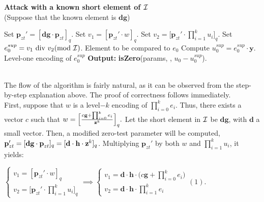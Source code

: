 \begin{tcolorbox}[colframe=black,colback=white,arc=0pt,outer arc=0pt]
	\begin{center}
		\textbf{Attack with a known short element of $\mathcal{I}$}\\
		(Suppose that the known element is $\textbf{dg}$)
	\end{center}
	\begin{algorithmic}[1]
		\State Set $\textbf{p}_{zt}' = [\textbf{dg} \cdot \textbf{p}_{zt}]_q$.
		\Statex
		\State Set $v_1 = [\textbf{p}_{zt}' \cdot w]_q$.
		\Statex
		\State Set $v_2 = \Bigg[ \textbf{p}_{zt}' \cdot \displaystyle{\prod_{i = 1}^{k} u_i} \Bigg]_q$.
		\Statex
		\State Set $e^{sup}_0 = v_1 \text{ div } v_2 (\text{mod } \mathcal{I})$. \Comment Element to be compared to $e_0$
		\Statex
		\State Compute $u_0^{sup} = e_0^{sup} \cdot \textbf{y}$.	 \Comment Level-one encoding of $e_0^{sup}$
		\Statex
		\State \textbf{Output:} \textbf{isZero}(params, \pzt, $u_0 - u_0^{sup}$). 
	\end{algorithmic}
\end{tcolorbox}
~\\

The flow of the algorithm is fairly natural, as it can be observed from the step-by-step explanation above. The proof of correctness follows immediately. \\

First, suppose that $w$ is a level$-k$ encoding of $\displaystyle{\prod_{i = 0}^{k} e_i}$. Thus, there exists a vector $c$ such that $w = \Big[ \frac{c \textbf{g} + \prod_{i = 0}^{k} e_i}{\textbf{z}^k} \Big]_q.$ Let the short element in $\mathcal{I}$ be $\textbf{dg}$, with $\textbf{d}$ a small vector. Then, a modified zero-test parameter will be computed, $\textbf{p}_{zt}' = [\textbf{dg} \cdot \textbf{p}_{zt}]_q = [\textbf{d} \cdot \textbf{h} \cdot \textbf{z}^k]_q$. Multiplying $\textbf{p}_{zt}'$ by both $w$ and $\displaystyle{\prod_{i = 1}^{k} u_i}$, it yields:

\begin{center}
	$
	\begin{cases}
			v_1 = [\textbf{p}_{zt}' \cdot w]_q \\
			 v_2 = \bigg[ \textbf{p}_{zt}' \cdot \displaystyle{\prod_{i = 1}^{k} u_i} \bigg]_q
	\end{cases}
	 \implies 
		\begin{cases}
	v_1 = \textbf{d} \cdot \textbf{h} \cdot \bigg( c\textbf{g} + \displaystyle{\prod_{i = 0}^{k} e_i} \bigg) \\
	v_2 = \textbf{d} \cdot \textbf{h} \cdot \displaystyle{\prod_{i = 1}^{k} e_i}
	\end{cases} (1).
	$
	
\end{center}

